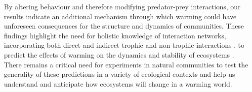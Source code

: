 By altering behaviour and therefore modifying predator-prey interactions, our results indicate an additional mechanism through which warming could have unforeseen consequences for the structure and dynamics of communities.  These findings highlight the need for holistic knowledge of interaction networks, incorporating both direct and indirect trophic and non-trophic interactions \citep{kefi2016}, to predict the effects of warming on the dynamics and stability of ecosystems \citep{kordas2017}. There remains a critical need for experiments in natural communities to test the generality of these predictions in a variety of ecological contexts and help us understand and anticipate how ecosystems will change in a warming world.


